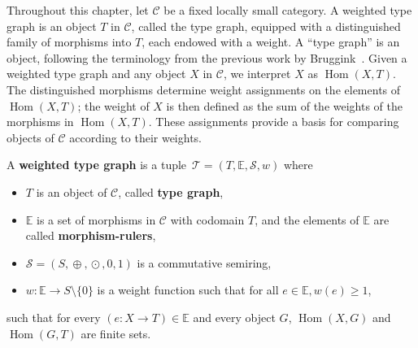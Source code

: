 Throughout this chapter, let \(\mathcal{C}\) be a fixed locally small category. A weighted type graph is an object \(T\) in \(\mathcal{C}\), called the type graph, equipped with a distinguished family of morphisms into \(T\), each endowed with a weight. 
A \enquote{type graph} is an object, following the terminology from the previous work by Bruggink~\cite{bruggink2014termination}.
 Given a weighted type graph and any object \(X\) in \(\mathcal{C}\), we interpret \(X\) as \(\operatorname{Hom}(X,T)\). The distinguished morphisms determine weight assignments on the elements of \(\operatorname{Hom}(X,T)\); the weight of \(X\) is then defined as the sum of the weights of the morphisms in \(\operatorname{Hom}(X,T)\). These assignments provide a basis for comparing objects of \(\mathcal{C}\) according to their weights.

\begin{definition}
    \label{wf:def:weighted_type_graph}
    A \textbf{weighted type graph} is a tuple~\(\mathcal{T} \mathop{=} (T, \mathbb{E}, \mathcal{S}, w)\) where
    \begin{itemize} 
        \item \(T\) is an object of $\mathcal{C}$, called \textbf{type graph},
        \item \(\mathbb{E}\) is a set of morphisms in $\mathcal{C}$ with codomain $T$, and the elements of \(\mathbb{E}\) are called \textbf{morphism-rulers},
        \item \(\mathcal{S}=(S, \mathop{\oplus}, \mathop{\odot}, 0, 1)\) is a commutative semiring,
        \item \(w : \mathbb{E} \mathop{\to} S \mathop{\setminus} \{0\}\) is a weight function such that for all $e \mathop{\in} \mathbb{E}, w(e) \mathop{\geq} 1$,
    \end{itemize}
    such that for every \( (e :X \mathop{\to} T) \mathop{\in} \mathbb{E}\) and every object \(G\), \(\operatorname{Hom}(X, G)\) and \(\operatorname{Hom}(G, T)\) are finite sets.
\end{definition}

